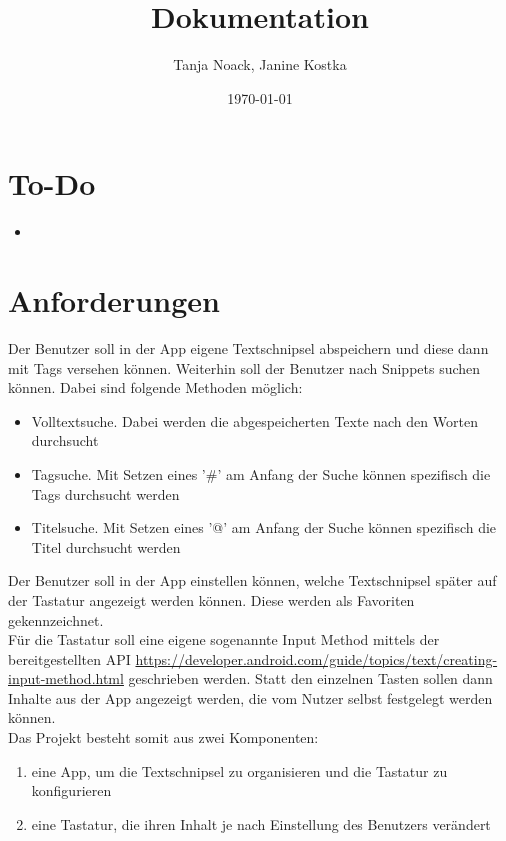 \documentclass[11pt]{article}
\title{Dokumentation}
\author{Tanja Noack, Janine Kostka}
\date{\today}
\begin{document}
	\maketitle  
	\pagebreak
	
	
	\tableofcontents
	\pagebreak
	
	
	\section{To-Do}
	\begin{itemize}
		\item 
	\end{itemize}
	
	\section{Anforderungen}
	Der Benutzer soll in der App eigene Textschnipsel abspeichern und diese dann mit Tags versehen können. Weiterhin soll der Benutzer nach Snippets suchen können. Dabei sind folgende Methoden möglich: 
	\begin{itemize}
		\item Volltextsuche. Dabei werden die abgespeicherten Texte nach den Worten durchsucht
		\item Tagsuche. Mit Setzen eines '\#' am Anfang der Suche können spezifisch die Tags durchsucht werden
		\item Titelsuche. Mit Setzen eines '@' am Anfang der Suche können spezifisch die Titel durchsucht werden
	\end{itemize}
	
	Der Benutzer soll in der App einstellen können, welche Textschnipsel später auf der Tastatur angezeigt werden können. Diese werden als Favoriten gekennzeichnet. \\
	
	\noindent Für die Tastatur soll eine eigene sogenannte Input Method mittels der bereitgestellten API \sloppy\url{https://developer.android.com/guide/topics/text/creating-input-method.html} geschrieben werden. Statt den einzelnen Tasten sollen dann Inhalte aus der App angezeigt werden, die vom Nutzer selbst festgelegt werden können.\\
	
	Das Projekt besteht somit aus zwei Komponenten:
	\begin{enumerate}
		\item eine App, um die Textschnipsel zu organisieren und die Tastatur zu konfigurieren
		\item eine Tastatur, die ihren Inhalt je nach Einstellung des Benutzers verändert
	\end{enumerate}
	
\end{document}
